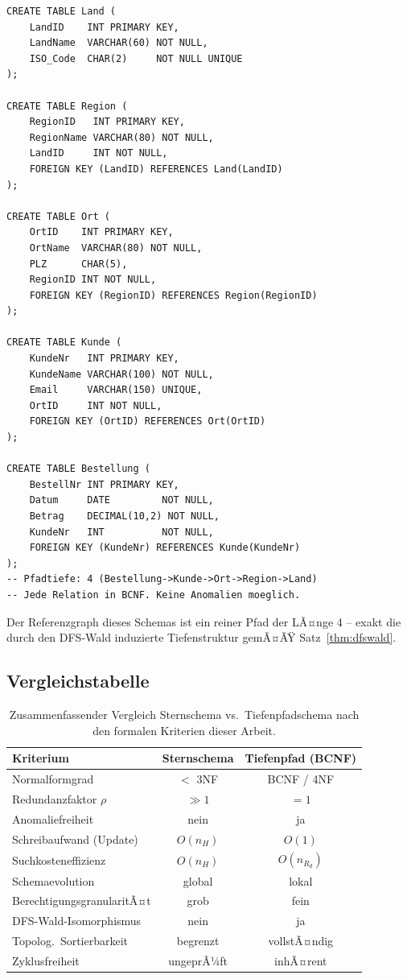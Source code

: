 ﻿\documentclass[a4paper,12pt]{report}
\theoremstyle{definition}
\theoremstyle{remark}
\begin{document}
\begin{lstlisting}[caption={Korrekte Tiefenpfadstruktur: BCNF-konformes Schema},label=lst:tief]
CREATE TABLE Land (
    LandID    INT PRIMARY KEY,
    LandName  VARCHAR(60) NOT NULL,
    ISO_Code  CHAR(2)     NOT NULL UNIQUE
);

CREATE TABLE Region (
    RegionID   INT PRIMARY KEY,
    RegionName VARCHAR(80) NOT NULL,
    LandID     INT NOT NULL,
    FOREIGN KEY (LandID) REFERENCES Land(LandID)
);

CREATE TABLE Ort (
    OrtID    INT PRIMARY KEY,
    OrtName  VARCHAR(80) NOT NULL,
    PLZ      CHAR(5),
    RegionID INT NOT NULL,
    FOREIGN KEY (RegionID) REFERENCES Region(RegionID)
);

CREATE TABLE Kunde (
    KundeNr   INT PRIMARY KEY,
    KundeName VARCHAR(100) NOT NULL,
    Email     VARCHAR(150) UNIQUE,
    OrtID     INT NOT NULL,
    FOREIGN KEY (OrtID) REFERENCES Ort(OrtID)
);

CREATE TABLE Bestellung (
    BestellNr INT PRIMARY KEY,
    Datum     DATE         NOT NULL,
    Betrag    DECIMAL(10,2) NOT NULL,
    KundeNr   INT          NOT NULL,
    FOREIGN KEY (KundeNr) REFERENCES Kunde(KundeNr)
);
-- Pfadtiefe: 4 (Bestellung->Kunde->Ort->Region->Land)
-- Jede Relation in BCNF. Keine Anomalien moeglich.
\end{lstlisting}

Der Referenzgraph dieses Schemas ist ein reiner Pfad der LÃ¤nge 4 --
exakt die durch den DFS-Wald induzierte Tiefenstruktur gemÃ¤ÃŸ
Satz~\ref{thm:dfswald}.

\subsection{Vergleichstabelle}

\begin{table}[H]
\centering
\renewcommand{\arraystretch}{1.35}
\begin{tabular}{lcc}
\toprule
\textbf{Kriterium} & \textbf{Sternschema} & \textbf{Tiefenpfad (BCNF)} \\
\midrule
Normalformgrad            & $<$ 3NF   & BCNF / 4NF \\
Redundanzfaktor $\rho$    & $\gg 1$   & $= 1$ \\
Anomaliefreiheit          & nein      & ja \\
Schreibaufwand (Update)   & $O(n_H)$  & $O(1)$ \\
Suchkosteneffizienz       & $O(n_H)$  & $O(n_{R_d})$ \\
Schemaevolution           & global    & lokal \\
BerechtigungsgranularitÃ¤t & grob      & fein \\
DFS-Wald-Isomorphismus    & nein      & ja \\
Topolog.\ Sortierbarkeit  & begrenzt  & vollstÃ¤ndig \\
Zyklusfreiheit            & ungeprÃ¼ft & inhÃ¤rent \\
\bottomrule
\end{tabular}
\caption{Zusammenfassender Vergleich Sternschema vs.\ Tiefenpfadschema
nach den formalen Kriterien dieser Arbeit.}
\label{tab:vergleich}
\end{table}
\end{document}
